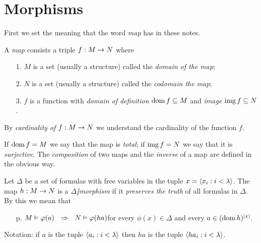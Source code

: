 \documentclass[creche.tex]{subfiles}
\begin{document}
\section{Morphisms}
\label{morphisms}

\def\ceq#1#2#3{\parbox[b]{15ex}{$\displaystyle #1$}\parbox[b]{6ex}{\hfil$#2$}$\displaystyle #3$}

First we set the meaning that the word \emph{map\/} has in these notes.

\begin{definition}\label{defmappa}
A \emph{map\/} consists a triple $f:M\rightarrow N$ where
\begin{itemize}
\item[1.] $M$ is a set (usually a structure) called the \emph{domain of the map};
\item[2.] $N$ is a set (usually a structure) called the \emph{codomain the map};
\item[3.] $f$ is a function with \emph{domain of definition\/} $\mathop{\rm dom} f\subseteq M$ and \emph{image} $\mathop{\rm img} f\subseteq N$.
\end{itemize}
By \emph{cardinality of $f:M\rightarrow N$\/} we understand the cardinality of the function $f$.\QED
\end{definition}

If $\mathop{\rm dom} f = M$ we say that the map is \emph{total}; if $\mathop{\rm img} f=N$ we say that it is \emph{surjective\/}. The \emph{composition\/} of two maps and the \emph{inverse\/} of a map are defined in the obvious way.

\begin{definition}\label{defpreservaveritas}
Let $\Delta$ be a set of formulas with free variables in the tuple $x=\langle x_i: i<\lambda\rangle$. The map $h:M\rightarrow N$ is a \emph{$\Delta\jj$morphism\/} if it  \emph{preserves the truth\/} of all formulas in $\Delta$. By this we mean that
\begin{itemize}
\item[p.] $M\models\phi(a)\ \ \IMP\ \ N\models\phi(ha)$\hfill for every $\phi(x)\in\Delta$ and every $a\in(\mathop{\rm dom} h)^{|x|}$.
\end{itemize}
Notation: if $a$ is the tuple $\langle a_i: i<\lambda\rangle$ then $ha$ is the tuple $\langle ha_i: i<\lambda\rangle$.\QED
\end{definition}
\end{document}
